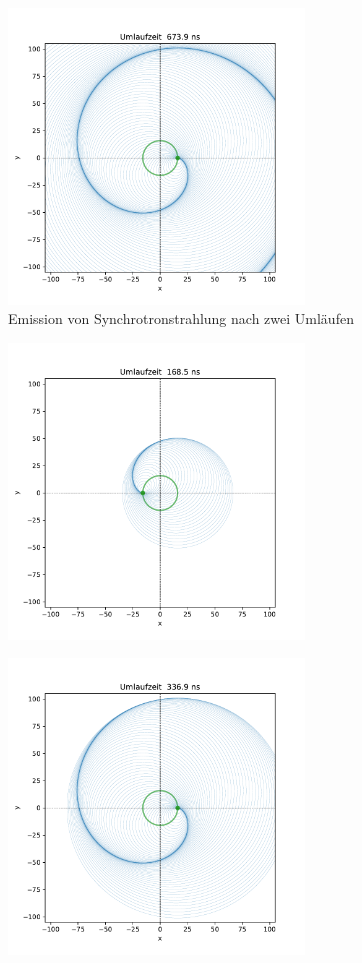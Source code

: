 \documentclass[11pt,a4paper]{article}
\begin{document}
        \begin{figure}[h]
            \centering
            \includegraphics[width=0.7\textwidth]{synchrotron-0673.9.pdf}
            \caption{Emission von Synchrotronstrahlung nach zwei Umläufen}
        \end{figure}

        \begin{figure}[h]
            \centering
            \includegraphics[width=0.7\textwidth]{synchrotron-0168.5.pdf}
        \end{figure}

        \begin{figure}[h]
            \centering
            \includegraphics[width=0.7\textwidth]{synchrotron-0336.9.pdf}
        \end{figure}
\end{document}
